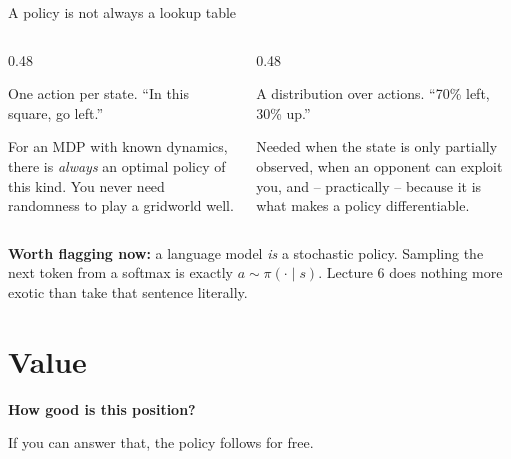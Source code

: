 \documentclass[aspectratio=169]{beamer}
\begin{document}
\begin{frame}{A policy is not always a lookup table}
  \begin{columns}[T]
    \begin{column}{0.48\textwidth}
      \begin{tcolorbox}[colback=armblue!8, colframe=armblue, boxrule=0.6pt, arc=2pt,
                        title={\textbf{Deterministic} $\pi(s) = a$}]
        \small
        One action per state. ``In this square, go left.''

        \vskip 4pt
        For an MDP with known dynamics, there is \emph{always} an optimal policy of this kind.
        You never need randomness to play a gridworld well.
      \end{tcolorbox}
    \end{column}
    \begin{column}{0.48\textwidth}
      \begin{tcolorbox}[colback=paramgreen!8, colframe=paramgreen, boxrule=0.6pt, arc=2pt,
                        title={\textbf{Stochastic} $\pi(a \mid s)$}]
        \small
        A distribution over actions. ``70\% left, 30\% up.''

        \vskip 4pt
        Needed when the state is only partially observed, when an opponent can exploit you, and
        -- practically -- because it is what makes a policy differentiable.
      \end{tcolorbox}
    \end{column}
  \end{columns}

  \vskip 8pt
  \begin{tcolorbox}[colback=armorange!12, colframe=armorange, boxrule=0.6pt, arc=2pt]
    \small
    \textbf{Worth flagging now:} a language model \emph{is} a stochastic policy. Sampling the
    next token from a softmax is exactly $a \sim \pi(\cdot \mid s)$. Lecture 6 does nothing more
    exotic than take that sentence literally.
  \end{tcolorbox}
\end{frame}

\section{Value}
\begin{frame}[plain]
  \begin{center}
    \vskip 1.6cm
    {\Huge\bfseries\color{popblue}How good is this position?}

    \vskip 0.6cm
    {\large If you can answer that, the policy follows for free.}
  \end{center}
\end{frame}
\end{document}
